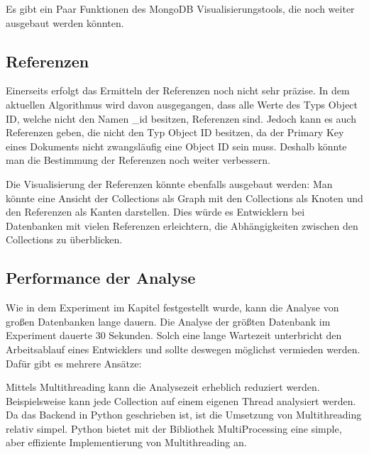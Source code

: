 \iffalse
Im Ausblick werden Ideen für die Weiterentwicklung der erstellten Lösung 
aufgezeigt. Der Ausblick sollte daher zeigen, dass die Ergebnisse der 
Arbeit nicht nur für die in der Arbeit identifizierten Problemstellungen 
verwendbar sind, sondern darüber hinaus erweitert sowie auf andere 
Probleme übertragen werden können.
\fi

Es gibt ein Paar Funktionen des MongoDB Visualisierungstools, die noch weiter ausgebaut werden könnten.

\subsection{Referenzen}
\label{sub:ausblick_referenzen}

Einerseits erfolgt das Ermitteln der Referenzen noch nicht sehr präzise.
In dem aktuellen Algorithmus wird davon ausgegangen, dass alle Werte des Typs Object ID, welche nicht den Namen \_id besitzen, Referenzen sind.
Jedoch kann es auch Referenzen geben, die nicht den Typ Object ID besitzen, da der Primary Key eines Dokuments nicht zwangsläufig eine Object ID sein muss.
Deshalb könnte man die Bestimmung der Referenzen noch weiter verbessern.

Die Visualisierung der Referenzen könnte ebenfalls ausgebaut werden:
Man könnte eine Ansicht der Collections als Graph mit den Collections als Knoten und den Referenzen als Kanten darstellen.
Dies würde es Entwicklern bei Datenbanken mit vielen Referenzen erleichtern, die Abhängigkeiten zwischen den Collections zu überblicken.

\subsection{Performance der Analyse}
\label{sub:ausblick_performance}

Wie in dem Experiment im Kapitel  festgestellt wurde, kann die Analyse von großen Datenbanken lange dauern.
Die Analyse der größten Datenbank im Experiment dauerte 30 Sekunden.
Solch eine lange Wartezeit unterbricht den Arbeitsablauf eines Entwicklers und sollte deswegen möglichst vermieden werden.
Dafür gibt es mehrere Ansätze:

Mittels Multithreading kann die Analysezeit erheblich reduziert werden.
Beispielsweise kann jede Collection auf einem eigenen Thread analysiert werden.
Da das Backend in Python geschrieben ist, ist die Umsetzung von Multithreading relativ simpel.
Python bietet mit der Bibliothek MultiProcessing eine simple, aber effiziente Implementierung von Multithreading an.
~\autocite{python:multiprocessing}

